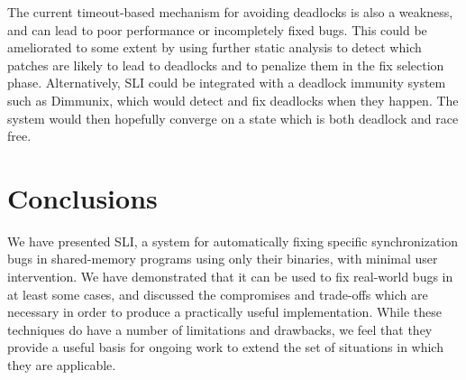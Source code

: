 \documentclass[10pt,letter,twocolumn]{sigplanconf}
\newcommand{\editorial}[1]{}
\begin{document}
The current timeout-based mechanism for avoiding deadlocks is also a
weakness, and can lead to poor performance or incompletely fixed bugs.
This could be ameliorated to some extent by using further static
analysis to detect which patches are likely to lead to deadlocks and
to penalize them in the fix selection phase.  Alternatively, SLI could
be integrated with a deadlock immunity system such as
Dimmunix\cite{Jula2008}, which would detect and fix deadlocks when
they happen.  The system would then hopefully converge on a state
which is both deadlock and race free.

\section{Conclusions}

We have presented SLI, a system for automatically fixing specific
synchronization bugs in shared-memory programs using only their
binaries, with minimal user intervention.  We have demonstrated that
it can be used to fix real-world bugs in at least some cases, and
discussed the compromises and trade-offs which are necessary in order
to produce a practically useful implementation.  While these
techniques do have a number of limitations and drawbacks, we feel that
they provide a useful basis for ongoing work to extend the set of
situations in which they are applicable.\editorial{Wibble wibble
  wibble}




\end{document}
